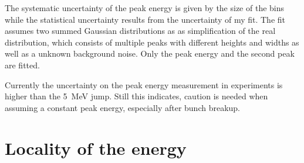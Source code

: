 \documentclass[bachelor_thesis]{subfiles}
\begin{document}
The systematic uncertainty of the peak energy is given by the size of the bins while the statistical uncertainty results from the uncertainty of my fit.  The fit assumes two summed Gaussian distributions as as
simplification of the real distribution, which consists of multiple peaks with different heights and widths as well as a unknown background noise. Only the peak energy and the second peak are fitted.

Currently the uncertainty on the peak energy measurement in experiments is higher than the \qty{5}{\MeV} jump. Still this indicates, caution is needed when assuming a constant peak energy, especially after bunch breakup.

\section{Locality of the energy}\label{chap:loc_E}
\end{document}
